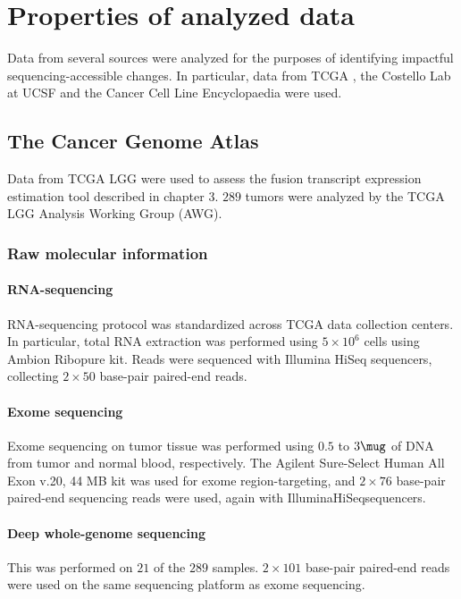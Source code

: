 \chapter{Properties of analyzed data}

Data from several sources were analyzed for the purposes of
identifying impactful sequencing-accessible changes. In particular,
data from TCGA \cite{_comprehensive_2015}, the Costello Lab at
UCSF\cite{johnson_mutational_2014} and the Cancer Cell Line
Encyclopaedia\cite{barretina_cancer_2012} were used.

\section{The Cancer Genome Atlas}

Data from TCGA LGG were used to assess the fusion transcript
expression estimation tool described in chapter 3. $289$ tumors were
analyzed by the TCGA LGG Analysis Working Group (AWG).

\subsection{Raw molecular information}

\subsubsection{RNA-sequencing}
RNA-sequencing protocol was standardized across TCGA data collection
centers. In particular, total RNA extraction was performed using
$5 \times 10^6$ cells using Ambion\textsuperscript{\textregistered}
Ribopure\textsuperscript{\texttrademark} kit. Reads were sequenced
with Illumina\textsuperscript{\textregistered}
HiSeq\textsuperscript{\texttrademark} sequencers, collecting
$2 \times 50$ base-pair paired-end reads.

\subsubsection{Exome sequencing}
Exome sequencing on tumor tissue was performed using $0.5$ to $3 \mug$
of DNA from tumor and normal blood, respectively. The Agilent\reg
Sure-Select Human All Exon \tm v.20, 44 MB kit was used for exome
region-targeting, and $2 \times 76$ base-pair paired-end sequencing
reads were used, again with Illumina\reg HiSeq\tm sequencers.


\subsubsection{Deep whole-genome sequencing}
This was performed on $21$ of the $289$ samples. $2 \times 101$
base-pair paired-end reads were used on the same sequencing platform
as exome sequencing.

